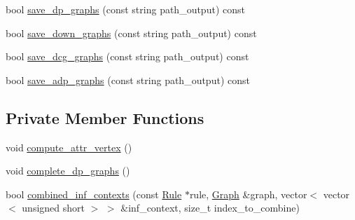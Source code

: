 \begin{DoxyCompactItemize}
\item 
bool \hyperlink{classgenevalmag_1_1Builder__graphs_a525d16f83c419ec6751379b860c625d6}{save\_\-dp\_\-graphs} (const string path\_\-output) const 
\item 
bool \hyperlink{classgenevalmag_1_1Builder__graphs_a18516e61124884d50ee9fb14f833ca01}{save\_\-down\_\-graphs} (const string path\_\-output) const 
\item 
bool \hyperlink{classgenevalmag_1_1Builder__graphs_a572e65e40e16066f068c82af178c22c2}{save\_\-dcg\_\-graphs} (const string path\_\-output) const 
\item 
bool \hyperlink{classgenevalmag_1_1Builder__graphs_aaf2e8aa86ea96212833d769110eeaebd}{save\_\-adp\_\-graphs} (const string path\_\-output) const 
\end{DoxyCompactItemize}
\subsection*{Private Member Functions}
\begin{DoxyCompactItemize}
\item 
void \hyperlink{classgenevalmag_1_1Builder__graphs_aa59af10c4b00c93e0bd95c1a17166ea5}{compute\_\-attr\_\-vertex} ()
\item 
void \hyperlink{classgenevalmag_1_1Builder__graphs_a6517d3d908a698316f76ac647b587982}{complete\_\-dp\_\-graphs} ()
\item 
bool \hyperlink{classgenevalmag_1_1Builder__graphs_ae8827b596ff808331a1d6e8005e7f71b}{combined\_\-inf\_\-contexts} (const \hyperlink{classgenevalmag_1_1Rule}{Rule} $\ast$rule, \hyperlink{namespacegenevalmag_a4a96de9ebfc7d48233406ab9cad55cb5}{Graph} \&graph, vector$<$ vector$<$ unsigned short $>$ $>$ \&inf\_\-context, size\_\-t index\_\-to\_\-combine)
\end{DoxyCompactItemize}
